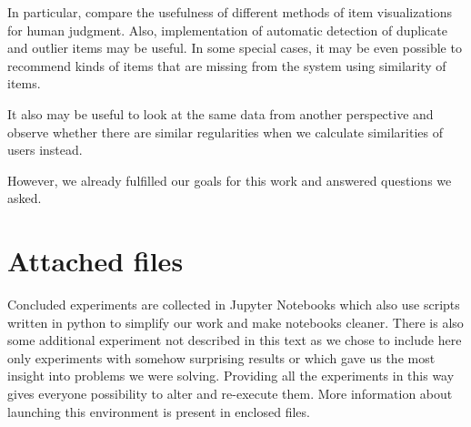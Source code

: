 \documentclass[
  printed, %
  table,   %
  nolof,     %
  nolot,     %
  color,
  final,
  nocover
]{fithesis3}
\begin{document}
In particular, compare the usefulness of different methods of item visualizations for human judgment. Also, implementation of automatic detection of duplicate and outlier items may be useful. In some special cases, it may be even possible to recommend kinds of items that are missing from the system using similarity of items.

It also may be useful to look at the same data from another perspective and observe whether there are similar regularities when we calculate similarities of users instead.


However, we already fulfilled our goals for this work and answered questions we asked.


\makeatletter\thesis@blocks@clear\makeatother

\appendix %


\chapter{Attached files}

Concluded experiments are collected in Jupyter Notebooks which also use scripts written in python to simplify our work and make notebooks cleaner. There is also some additional experiment not described in this text as we chose to include here only experiments with somehow surprising results or which gave us the most insight into problems we were solving. Providing all the experiments in this way gives everyone possibility to alter and re-execute them. More information about launching this environment is present in enclosed files.
\end{document}
